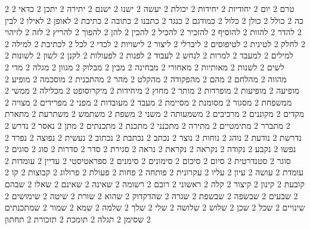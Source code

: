       2 טרם
      2 יום
      2 יחודיות
      2 יחידות
      2 יכולת
      2 יעשה
      2 ישנו
      2 ישנם
      2 יתירה
      2 יתכן
      2 כדאי
      2 כה
      2 כולל
      2 כולן
      2 כלול
      2 כמודגם
      2 כנגד
      2 כתבנו
      2 כתובה
      2 כתיבת
      2 לאופן
      2 לאילו
      2 לבין
      2 להדר
      2 להוות
      2 להוסיף
      2 להזכיר
      2 להכיל
      2 להכין
      2 להן
      2 להפוך
      2 להריץ
      2 לזה
      2 לזיהוי
      2 לחלק
      2 לטינית
      2 לטיפוסים
      2 ליברלי
      2 ליצור
      2 לישויות
      2 לכדי
      2 לכל
      2 לכתיבת
      2 למילה
      2 למילים
      2 למעבד
      2 למרות
      2 לנחש
      2 לעבוד
      2 לפנות
      2 לפעולות
      2 לקנן
      2 לשון
      2 לשונות
      2 לשים
      2 לשנות
      2 מאותיות
      2 מאחורי
      2 מבחינה
      2 מבין
      2 מבלוק
      2 מגוון
      2 מגלה
      2 מדי
      2 מהווה
      2 מהלחם
      2 מהם
      2 מהפקודה
      2 מהקלט
      2 מהר
      2 מהתכנית
      2 מוסכמה
      2 מופיע
      2 מופיעה
      2 מופיעות
      2 מופרדות
      2 מותר
      2 מחוץ
      2 מיחידות
      2 מיקרוסופט
      2 מכלילה
      2 ממשי
      2 ממשפחת
      2 מסגור
      2 מסומנת
      2 מסיימת
      2 מעבד
      2 מעובדות
      2 מפני
      2 מפרידים
      2 מצויה
      2 מקדים
      2 מקוננים
      2 מרכיבים
      2 משמעותה
      2 משני
      2 משפת
      2 משתמש
      2 משתרעת
      2 מתארת
      2 מתברר
      2 מתימטיים
      2 מתירה
      2 מתכנני
      2 מתכנת
      2 מתכנתים
      2 מתן
      2 נאסר
      2 נדרש
      2 נדרשת
      2 נודעת
      2 נוהג
      2 נוחות
      2 נוצר
      2 נכתב
      2 נכתבת
      2 נכתוב
      2 נעשית
      2 נפוצה
      2 נפרד
      2 נפשו
      2 נקבע
      2 נקודה
      2 נקראה
      2 נקראת
      2 נראה
      2 סגירת
      2 סדר
      2 סדרות
      2 סוג
      2 סוגים
      2 סוגר
      2 סטנדרטית
      2 סיום
      2 סיכום
      2 סימונים
      2 סימנים
      2 ספראטיסטי
      2 עדיין
      2 עומדות
      2 עומדת
      2 עושה
      2 עיון
      2 עליו
      2 עקרונית
      2 פותחה
      2 פחות
      2 פעולת
      2 פרולוג
      2 קבוצות
      2 קו
      2 קובעת
      2 קינון
      2 קיצור
      2 קלה
      2 ראשוני
      2 רובם
      2 רשומה
      2 שאינה
      2 שאינם
      2 שאלו
      2 שבהם
      2 שבעים
      2 שבשפה
      2 שבשפת
      2 שגרה
      2 שהדקדוק
      2 שהוא
      2 שורת
      2 שיטה
      2 שימושים
      2 שינויים
      2 שכל
      2 שכן
      2 שלוש
      2 שלושה
      2 שלי
      2 שלך
      2 שלמה
      2 שמא
      2 שמור
      2 שמתכנתים
      2 שסימן
      2 תגלה
      2 תומכת
      2 תזכורת
      2 תחתון
